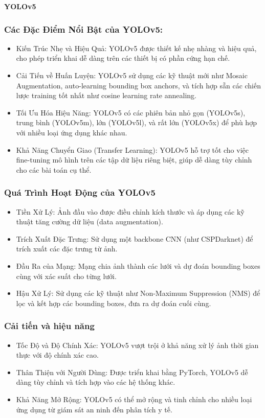 \begin{flushleft}
    \textbf{YOLOv5}\\
    \fontsize{13}{20}\selectfont\subsubsection{Các Đặc Điểm Nổi Bật của YOLOv5:}
    \begin{itemize}
        \item Kiến Trúc Nhẹ và Hiệu Quả: YOLOv5 được thiết kế nhẹ nhàng và hiệu quả, cho phép triển khai dễ dàng trên các thiết bị có phần cứng hạn chế.
        \item Cải Tiến về Huấn Luyện: YOLOv5 sử dụng các kỹ thuật mới như Mosaic Augmentation, auto-learning bounding box anchors, và tích hợp sẵn các chiến lược training tốt nhất như cosine learning rate annealing.
        \item Tối Ưu Hóa Hiệu Năng: YOLOv5 có các phiên bản nhỏ gọn (YOLOv5s), trung bình (YOLOv5m), lớn (YOLOv5l), và rất lớn (YOLOv5x) để phù hợp với nhiều loại ứng dụng khác nhau.
        \item Khả Năng Chuyển Giao (Transfer Learning): YOLOv5 hỗ trợ tốt cho việc fine-tuning mô hình trên các tập dữ liệu riêng biệt, giúp dễ dàng tùy chỉnh cho các bài toán cụ thể.
    \end{itemize}
    \fontsize{13}{20}\selectfont\subsubsection{Quá Trình Hoạt Động của YOLOv5}
    \begin{itemize}
        \item Tiền Xử Lý: Ảnh đầu vào được điều chỉnh kích thước và áp dụng các kỹ thuật tăng cường dữ liệu (data augmentation).
        \item Trích Xuất Đặc Trưng: Sử dụng một backbone CNN (như CSPDarknet) để trích xuất các đặc trưng từ ảnh.
        \item Đầu Ra của Mạng: Mạng chia ảnh thành các lưới và dự đoán bounding boxes cùng với xác suất cho từng lưới.
        \item Hậu Xử Lý: Sử dụng các kỹ thuật như Non-Maximum Suppression (NMS) để lọc và kết hợp các bounding boxes, đưa ra dự đoán cuối cùng.
    \end{itemize}
    \fontsize{13}{20}\selectfont\subsubsection{Cải tiến và hiệu năng}
    \begin{itemize}
        \item Tốc Độ và Độ Chính Xác: YOLOv5 vượt trội ở khả năng xử lý ảnh thời gian thực với độ chính xác cao.
        \item Thân Thiện với Người Dùng: Được triển khai bằng PyTorch, YOLOv5 dễ dàng tùy chỉnh và tích hợp vào các hệ thống khác.
        \item Khả Năng Mở Rộng: YOLOv5 có thể mở rộng và tinh chỉnh cho nhiều loại ứng dụng từ giám sát an ninh đến phân tích y tế.
    \end{itemize}

\end{flushleft}
